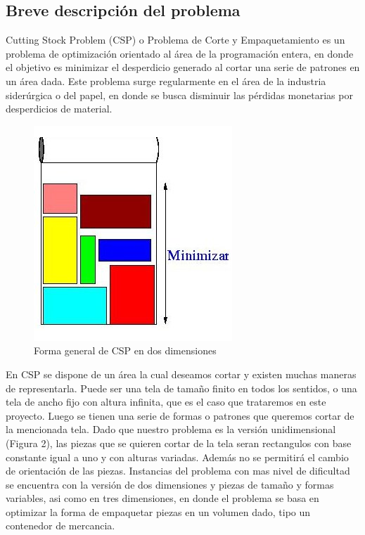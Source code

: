 \documentclass[letterpaper,11pt]{article}
\begin{document}
\subsection{Breve descripci\'on del problema}

Cutting Stock Problem (CSP) o Problema de Corte y Empaquetamiento es un problema de optimizaci\'on
orientado al \'area de la programaci\'on entera, en donde el objetivo es minimizar el desperdicio generado
al cortar una serie de patrones en un \'area dada. Este problema surge regularmente en el \'area de la
industria sider\'urgica o del papel, en donde se busca disminuir las p\'erdidas monetarias por desperdicios
de material.\\

\begin{figure}[htp]
\centering
\includegraphics[scale=0.7]{faixa3.jpg}
\caption{Forma general de CSP en dos dimensiones}
\end{figure}

En CSP se dispone de un \'area la cual deseamos cortar y existen muchas maneras de representarla. Puede
ser una tela de tamaño finito en todos los sentidos, o una tela de ancho fijo con altura infinita, que es
el caso que trataremos en este proyecto. Luego se tienen una serie de formas o patrones que queremos cortar
de la mencionada tela. Dado que nuestro problema es la versi\'on unidimensional (Figura 2), las piezas que se quieren
cortar de la tela seran rectangulos con base constante igual a uno y con alturas variadas. Adem\'as no se
permitir\'a el cambio de orientaci\'on de las piezas. Instancias del problema con mas nivel de dificultad
se encuentra con la versi\'on de dos dimensiones y piezas de tamaño y formas variables, asi como en tres
dimensiones, en donde el problema se basa en optimizar la forma de empaquetar piezas en un volumen
dado, tipo un contenedor de mercancia.
\end{document}
